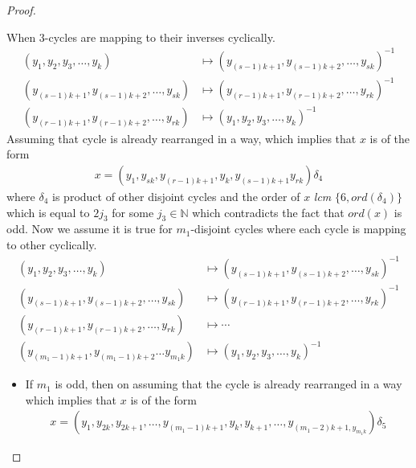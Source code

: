 \documentclass[oneside]{amsart}
\theoremstyle{plain}
\theoremstyle{definition}
\theoremstyle{remark}
\newcommand{\ord}{ord}
\begin{document}
\begin{proof}
\begin{itemize}
\begin{itemize}
                    When $3$-cycles are mapping to their inverses cyclically.
                    \begin{align*}
                        (y_1, y_2, y_3, \ldots , y_k) &\mapsto (y_{(s- 1)k + 1}, y_{(s- 1)k + 2}, \ldots , y_{sk})^{-1}\\
                        (y_{(s- 1)k + 1}, y_{(s- 1)k + 2}, \ldots , y_{sk})&\mapsto (y_{(r- 1)k + 1}, y_{(r- 1)k + 2}, \ldots , y_{rk})^{-1}\\
                        (y_{(r- 1)k + 1}, y_{(r- 1)k + 2}, \ldots , y_{rk})&\mapsto (y_1, y_2, y_3, \ldots , y_k)^{-1}
                    \end{align*} Assuming that cycle is already rearranged in a way, which implies that $x$ is of the form
                    \begin{align*}
                        x = (y_1, y_{sk}, y_{(r - 1)k + 1}, y_k, y_{(s - 1)k + 1}y_{rk})\delta_4
                    \end{align*}
                    where $\delta_4$ is product of other disjoint cycles and the order of $x$ \textit{lcm} $\{6, \ord(\delta_4)\}$ which is equal to $2j_3$ for some $j_3 \in \mathbb{N}$ which contradicts the fact that $\ord(x)$ is odd. Now we assume it is true for $m_1$-disjoint cycles where each cycle is mapping to other cyclically.
                    \begin{align*}
                        (y_1, y_2, y_3, \ldots , y_k) &\mapsto (y_{(s- 1)k + 1}, y_{(s- 1)k + 2}, \ldots , y_{sk})^{-1}\\
                        (y_{(s- 1)k + 1}, y_{(s- 1)k + 2}, \ldots , y_{sk})&\mapsto (y_{(r- 1)k + 1}, y_{(r- 1)k + 2}, \ldots , y_{rk})^{-1}\\
                        (y_{(r- 1)k + 1}, y_{(r- 1)k + 2}, \ldots , y_{rk})&\mapsto \cdots\\
                        (y_{(m_1- 1)k + 1}, y_{(m_1- 1)k + 2} \ldots y_{m_1k})&\mapsto (y_1, y_2, y_3, \ldots , y_k)^{-1}
                    \end{align*}
                    \begin{itemize}
                        \item[Case (2.a)] If $m_1$ is odd, then on assuming that the cycle is already rearranged in a way which implies that $x$ is of the form
                        \begin{align*}
                            x = (y_1, y_{2k}, y_{2k + 1}, \ldots , y_{(m_1 - 1)k + 1}, y_k, y_{k + 1}, \ldots, y_{(m_1 - 2)k + 1, y_{m_1k}})\delta_5

\end{align*}
\end{itemize}
\end{itemize}
\end{itemize}
\end{proof}
\end{document}
